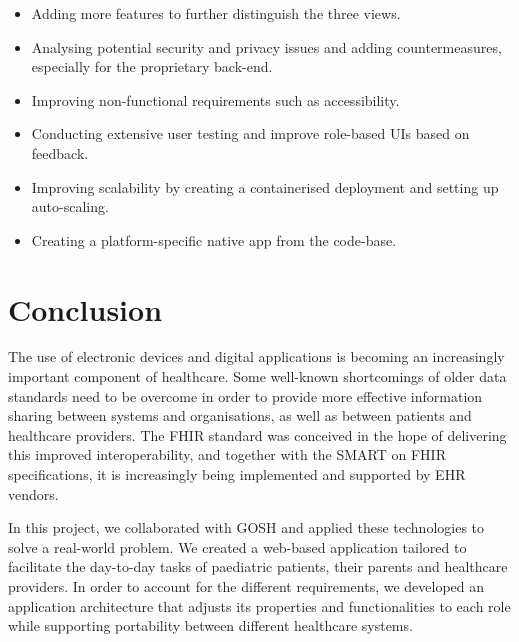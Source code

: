 \documentclass[sigconf]{acmart}
\begin{document}
\begin{itemize}
    \item Adding more features to further distinguish the three views.
    \item Analysing potential security and privacy issues and adding countermeasures, especially for the proprietary back-end.
    \item Improving non-functional requirements such as accessibility.
    \item Conducting extensive user testing and improve role-based UIs based on feedback.
    \item Improving scalability by creating a containerised deployment and setting up auto-scaling.
    \item Creating a platform-specific native app from the code-base.%
\end{itemize}


\section{Conclusion}
\label{sec:conclusion}

The use of electronic devices and digital applications is becoming an increasingly important component of healthcare. Some well-known shortcomings of older data standards need to be overcome in order to provide more effective information sharing between systems and organisations, as well as between patients and healthcare providers. The FHIR standard was conceived in the hope of delivering this improved interoperability, and together with the SMART on FHIR specifications, it is increasingly being implemented and supported by EHR vendors.

In this project, we collaborated with GOSH and applied these technologies to solve a real-world problem. We created a web-based application tailored to facilitate the day-to-day tasks of paediatric patients, their parents and healthcare providers. In order to account for the different requirements, we developed an application architecture that adjusts its properties and functionalities to each role while supporting portability between different healthcare systems.
\end{document}
